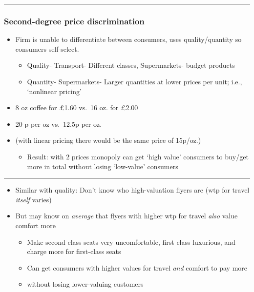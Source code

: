 \documentclass[]{article}
\providecommand{\tightlist}{%
  \setlength{\itemsep}{0pt}\setlength{\parskip}{0pt}}
\begin{document}
\begin{center}\rule{0.5\linewidth}{\linethickness}\end{center}

\hypertarget{second-degree-price-discrimination}{%
\subsubsection{Second-degree price discrimination}\label{second-degree-price-discrimination}}

\begin{itemize}
\tightlist
\item
  Firm is unable to differentiate between consumers, uses quality/quantity so consumers self-select.

  \begin{itemize}
  \tightlist
  \item
    Quality- Transport- Different classes, Supermarkets- budget products
  \item
    Quantity- Supermarkets- Larger quantities at lower prices per unit; i.e., `nonlinear pricing'
  \end{itemize}
\end{itemize}

\begin{itemize}
\tightlist
\item
  8 oz coffee for \pounds1.60 vs.~16 oz. for \pounds2.00
\item
  20 p per oz vs.~12.5p per oz.
\item
  (with linear pricing there would be the same price of 15p/oz.)

  \begin{itemize}
  \tightlist
  \item
    Result: with 2 prices monopoly can get `high value' consumers to buy/get more in total without losing `low-value' consumers
  \end{itemize}
\end{itemize}

\begin{center}\rule{0.5\linewidth}{\linethickness}\end{center}

\begin{itemize}
\tightlist
\item
  Similar with quality: Don't know who high-valuation flyers are (wtp for travel \emph{itself} varies)
\item
  But may know on \emph{average} that flyers with higher wtp for travel \emph{also} value comfort more

  \begin{itemize}
  \tightlist
  \item
    Make second-class seats very uncomfortable, first-class luxurious, and charge more for first-class seats
  \item
    Can get consumers with higher values for travel \emph{and} comfort to pay more
  \item
    without losing lower-valuing customers
  \end{itemize}
\end{itemize}
\end{document}
